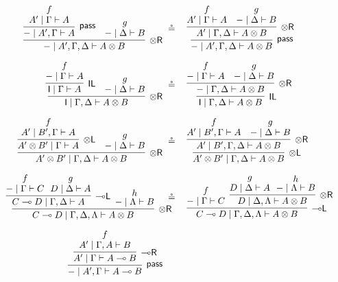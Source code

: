 \documentclass[sn-mathphys-num]{sn-jnl}%
\newcommand{\GG}{\Gamma}
\newcommand{\GD}{\Delta}
\newcommand{\GL}{\Lambda}
\newcommand{\vd}{\vdash}
\newcommand{\tl}{\otimes \mathsf{L}}
\newcommand{\tr}{\otimes\mathsf{R}}
\newcommand{\pass}{\mathsf{pass}}
\newcommand{\unitl}{\mathsf{IL}}
\newcommand{\ot}{\otimes}
\newcommand{\lolli}{\multimap}
\newcommand{\lleft}{{\lolli}\mathsf{L}}
\newcommand{\lright}{{\lolli}\mathsf{R}}
\newcommand{\unit}{\mathsf{I}}
\newcommand{\proofbox}[1]{\begin{tabular}{l} #1 \end{tabular}}
\theoremstyle{thmstyleone}%
\theoremstyle{thmstyletwo}%
\theoremstyle{thmstylethree}%
\begin{document}
\begin{figure}
  \begin{displaymath}
    \arraycolsep=0pt    
    \begin{array}{rcl}
      \proofbox{
      \infer[\tr]{{-} \mid A' , \GG , \GD \vd A \ot B}{
      \infer[\pass]{{-} \mid A' , \GG \vd A}{
      \deduce{A' \mid \GG \vd A}{f}
      }
      &
      \deduce{{-} \mid \GD \vd B}{g}
      }
      }
      
      &\circeq&
      
      \proofbox{
      \infer[\pass]{{-} \mid A' , \GG , \GD \vd A \ot B}{
      \infer[\tr]{A' \mid \GG , \GD \vd A \ot B}{
      \deduce{A' \mid \GG \vd A}{f}
      &
      \deduce{{-} \mid \GD \vd B}{g}
      }
      }
      }
      \\[30pt]
      \proofbox{
      \infer[\tr]{\unit \mid \GG , \GD \vd A \ot B}{
      \infer[\unitl]{\unit \mid \GG \vd A}{
      \deduce{{-} \mid \GG \vd A}{f}
      }
      &
      \deduce{{-} \mid \GD \vd B}{g}
      }
      }
      
      &\circeq&
      
      \proofbox{
      \infer[\unitl]{\unit \mid \GG , \GD \vd A \ot B}{
      \infer[\tr]{{-} \mid \GG , \GD \vd A \ot B}{
      \deduce{{-} \mid \GG \vd A}{f}
      &
      \deduce{{-} \mid \GD \vd B}{g}
      }
      }
      }
      \\[30pt]
      \proofbox{
      \infer[\tr]{A' \ot B' \mid \GG , \GD \vd A \ot B}{
      \infer[\tl]{A' \ot B' \mid \GG \vd A}{
      \deduce{A' \mid B' , \GG \vd A}{f}
      }
      &
      \deduce{{-} \mid \GD \vd B}{g}
      }
      }
      
      &\circeq&
      
      \proofbox{
      \infer[\tl]{A' \ot B' \mid \GG , \GD \vd A \ot B}{
      \infer[\tr]{A' \mid B' , \GG , \GD \vd A \ot B}{
      \deduce{A' \mid B', \GG \vd A}{f}
      &
      \deduce{{-} \mid \GD \vd B}{g}
      }
      }
      }
      \\[30pt]
      \proofbox{
      \infer[\tr]{C \lolli D \mid \GG , \GD , \GL \vd A \ot B}{
      \infer[\lleft]{C \lolli D \mid \GG , \GD \vd A}{
      \deduce{{-} \mid \GG \vd C}{f}
      & \!\!
      \deduce{D \mid \GD \vd A}{g}
      }
      & \!\!\!
      \deduce{{-} \mid \GL \vd B}{h}
      }
      } \!\!\!\!\!\!
      
      &\circeq&
      
      \proofbox{
      \infer[\lleft]{C \lolli D \mid \GG , \GD  , \GL\vd A \ot B}{
      \deduce{{-} \mid \GG \vd C}{f}
      & \!\!\!
      \infer[\tr]{D \mid \GD, \GL \vd A \ot B}{
      \deduce{D \mid \GD \vd A}{g}
      & \!\!
      \deduce{{-} \mid \GL \vd B}{h}
      }
      }
      }
      \\[30pt]
      \proofbox{
      \infer[\pass]{{-} \mid A' , \GG \vd A \lolli B}{
      \infer[\lright]{A' \mid \GG \vd A \lolli B}{
      \deduce{A' \mid \GG , A \vd B}{f}
      }
      }
      }
      

\end{array}
\end{displaymath}
\end{figure}
\end{document}
